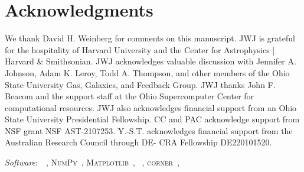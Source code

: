 \documentclass[ms.tex]{subfiles}
\begin{document}
\section{Acknowledgments}
\label{sec:acknowledgments}

We thank David H. Weinberg for comments on this manuscript.
JWJ is grateful for the hospitality of Harvard University and the 
Center for Astrophysics | Harvard \& Smithsonian.
JWJ acknowledges valuable discussion with Jennifer A. Johnson, Adam K. Leroy,
Todd A. Thompson, and other members of the Ohio State University Gas, Galaxies,
and Feedback Group.
JWJ thanks John F. Beacom and the support staff at the Ohio Supercomputer
Center for computational resources.
JWJ also acknowledges financial support from an Ohio State University
Presidential Fellowship.
CC and PAC acknowledge support from NSF grant NSF AST-2107253.
Y.-S.T. acknowledges financial support from the Australian Research Council
through DE- CRA Fellowship DE220101520.
\par\null\par\noindent
\textit{Software}:~\vice~\citep{Johnson2020},
\textsc{NumPy}~\citep{Harris2020},
\textsc{Matplotlib}~\citep{Hunter2007},
\mc~\citep{ForemanMackey2013},
\textsc{corner}~\citep{ForemanMackey2016},
\end{document}
